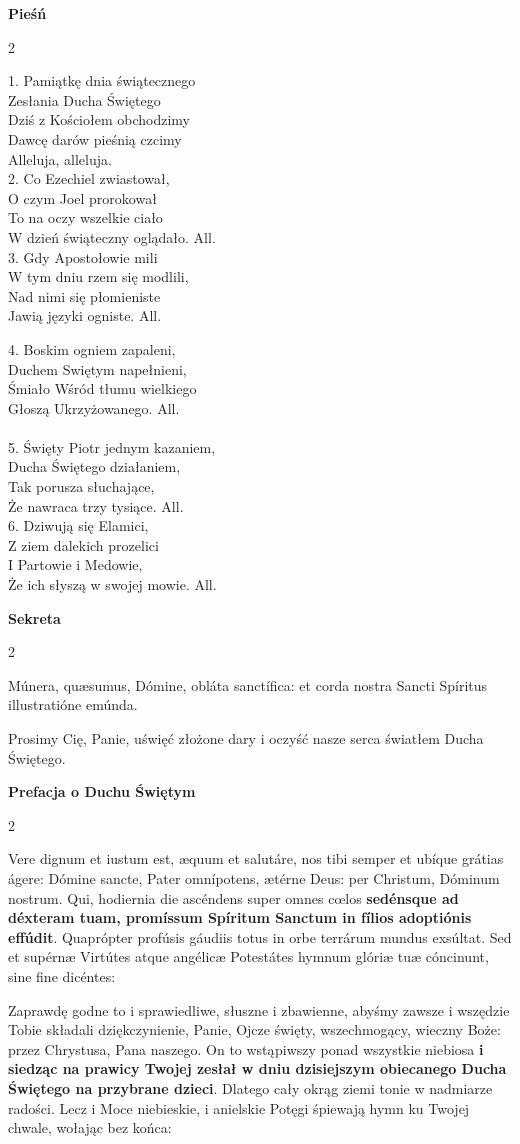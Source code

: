 \documentclass[10pt,a5paper]{book}
\newcommand{\oremus}[3]{\medskip\centerline{\textbf{#1}}\medskip
	\begin{sloppypar}
		\begin{paracol}{2}
			\setlength{\columnsep}{0em}
			\begin{leftcolumn}
				#2
			\end{leftcolumn}
			\begin{rightcolumn}
				#3
			\end{rightcolumn}
		\end{paracol}
	\end{sloppypar}}
\begin{document}
\oremus{Pieśń}{
	1. Pamiątkę dnia świątecznego\\
	Zesłania Ducha Świętego\\
	Dziś z Kościołem obchodzimy\\
	Dawcę darów pieśnią czcimy\\
	Alleluja, alleluja.\\

	2. Co Ezechiel zwiastował,\\
	O czym Joel prorokował\\
	To na oczy wszelkie ciało\\
	W dzień świąteczny oglądało. All.\\

	3. Gdy Apostołowie mili \\
	W tym dniu rzem się modlili,\\
	Nad nimi się płomieniste\\
	Jawią języki ogniste. All.}{
	4. Boskim ogniem zapaleni,\\
	Duchem Swiętym napełnieni,\\
	Śmiało Wśród tłumu wielkiego\\
	Głoszą Ukrzyżowanego. All.\\ \\

	5. Święty Piotr jednym kazaniem,\\
	Ducha Świętego działaniem,\\
	Tak porusza słuchające,\\
	Że nawraca trzy tysiące. All.\\

	6. Dziwują się Elamici,\\
	Z ziem dalekich prozelici\\
	I Partowie i Medowie,\\
	Że ich słyszą w swojej mowie. All.}

\oremus{Sekreta}{Múnera, qu\ae sumus, Dómine, obláta sanctífica: et corda nostra
	Sancti Spíritus illustratióne emúnda.}{Prosimy Cię, Panie, uświęć złożone
	dary i oczyść nasze serca światłem Ducha Świętego.}

\oremus{Prefacja o Duchu Świętym}{Vere dignum et iustum est, æquum et salutáre,
	nos tibi semper et ubíque grátias ágere: Dómine sancte, Pater omnípotens,
	ætérne Deus: per Christum, Dóminum nostrum. Qui, hodiernia die ascéndens
	super omnes c\oe los \textbf{sedénsque ad déxteram tuam, promíssum Spíritum
		Sanctum in fílios adoptiónis effúdit}. Quaprópter profúsis gáudiis totus in
	orbe terrárum mundus exsúltat. Sed et supérnæ Virtútes atque angélicæ
	Potestátes hymnum glóriæ tuæ cóncinunt, sine fine dicéntes:}{Zaprawdę godne
	to i sprawiedliwe, słuszne i zbawienne, abyśmy zawsze i wszędzie Tobie
	składali dziękczynienie, Panie, Ojcze święty, wszechmogący, wieczny Boże:
	przez Chrystusa, Pana naszego. On to wstąpiwszy ponad wszystkie niebiosa
	\textbf{i siedząc na prawicy Twojej zesłał w dniu dzisiejszym obiecanego
		Ducha Świętego na przybrane dzieci}. Dlatego cały okrąg ziemi tonie w
	nadmiarze radości. Lecz i Moce niebieskie, i anielskie Potęgi śpiewają hymn
	ku Twojej chwale, wołając bez końca:}
\end{document}
